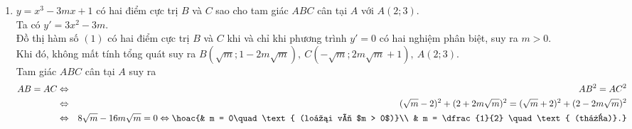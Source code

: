 \begin{bt}
{\begin{enumerate}
			Ta có $y' = x^2 - (3m + 2)x + (2m^2 + 3m  + 1)$ có $\Delta = m^2 > 0,\ \forall m \in \mathbb{R}$ \\
			$\Rightarrow y' = 0 \Leftrightarrow \heva{& x = 2m + 1 \\ & x = m + 1}$.\\ 
			Hàm số có cực đại và cực tiểu khi và chỉ khi $m  \ne 0$.\\
			\textbf{Trường hợp 1:} $x_{CD} = 2m  + 1;\ x_{CT} = m + 1$.\\
			Do $a = \dfrac{1}{3}  > 0$ nên suy ra $x_{CD} < x_{CT} \Leftrightarrow 2m + 1 < m + 1 \Leftrightarrow m < 0$.\\
			Lại có $3x_{CD}^2 = 4x_{CT} \Leftrightarrow 3(2m + 1)^2 = 4(m + 1) \Leftrightarrow 12m^2 + 8m - 1 = 0 \Leftrightarrow m = \dfrac{-2 \pm \sqrt{7}}{6}$.\\ 
			Với điều kiện  $m < 0 \Rightarrow m = \dfrac{-2 - \sqrt{7}}{6}$ thỏa mãn.\\
			\textbf{Trường hợp 2:} $x_{CD}  = m + 1;\ x_{CT} = 2m + 1$.\\
			Do $a = \dfrac{1}{3} > 0$ nên suy ra $x_{CD} < x_{CT} \Leftrightarrow m + 1 < 2m +  1 \Leftrightarrow m > 0$.\\
			Lại có  $3x_{CD}^2 = 4x_{CT} \Leftrightarrow 3(m + 1)^2 = 4(2m + 1) \Leftrightarrow 3m^2 - 2m - 1 = 0 \Leftrightarrow \hoac{& m = 1 \\ & m = -\dfrac{1}{3}.}$\\
			Với điều kiện $m  > 0 \Rightarrow m = 1$ thỏa mãn.
			 \item $y = x^3 - 3mx + 1$ có hai điểm cực trị $B$ và $C$ sao cho tam giác $ABC$ cân tại $A$ với $A(2;3)$.\\
			Ta có $y'  = 3x^2 - 3m$.\\
			Đồ thị hàm số $(1)$ có hai điểm cực trị $B$ và $C$ khi và chỉ khi phương trình $y' = 0$ có  hai nghiệm phân biệt, suy ra $m > 0$.\\
			Khi đó, không mất  tính tổng quát suy ra $B(\sqrt{m}; 1 - 2m\sqrt{m}),\ C(-\sqrt{m}; 2m\sqrt{m} + 1),\ A(2;3)$.\\
			Tam giác $ABC$ cân  tại $A$ suy ra
			\begin{eqnarray*}
				AB = AC &\Leftrightarrow& AB^2 =  AC^2\\
				&\Leftrightarrow& (\sqrt{m} - 2)^2 + (2 +  2m\sqrt{m})^2 = (\sqrt{m} + 2)^2 + (2 - 2m\sqrt{m})^2\\
				&\Leftrightarrow& 8\sqrt{m} - 16m\sqrt{m} = 0 \Leftrightarrow  \hoac{& m = 0\quad \text{ (loại vì $m > 0$)}\\ & m = \dfrac{1}{2} \quad \text{ (thỏa)}.}

\end{eqnarray*}
\end{enumerate}}
\end{bt}
